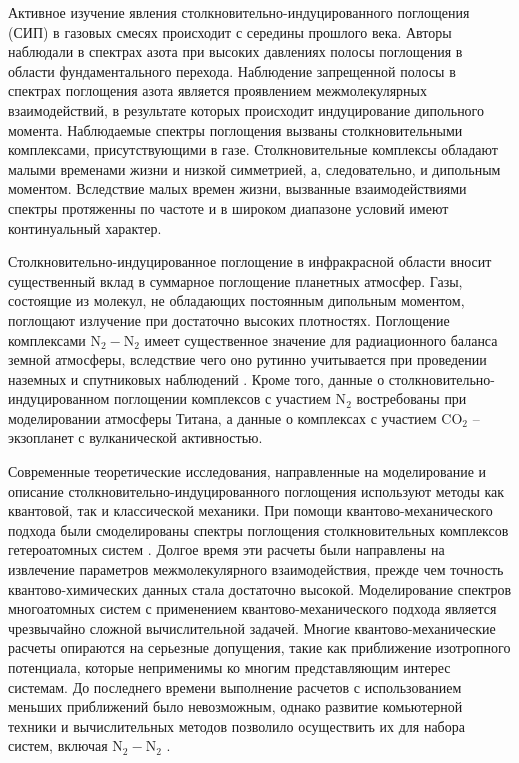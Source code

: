 Активное изучение явления столкновительно-индуцированного поглощения (СИП) в газовых смесях происходит с середины прошлого века. Авторы \cite{crawford1949} наблюдали в спектрах азота при высоких давлениях полосы поглощения в области фундаментального перехода. Наблюдение запрещенной полосы в спектрах поглощения азота является проявлением межмолекулярных взаимодействий, в результате которых происходит индуцирование дипольного момента. Наблюдаемые спектры поглощения вызваны столкновительными комплексами, присутствующими в газе. Столкновительные комплексы обладают малыми временами жизни и низкой симметрией, а, следовательно, и дипольным моментом. Вследствие малых времен жизни, вызванные взаимодействиями спектры протяженны по частоте и в широком диапазоне условий имеют континуальный характер. \par 
Столкновительно-индуцированное поглощение в инфракрасной области вносит существенный вклад в суммарное поглощение планетных атмосфер. Газы, состоящие из молекул, не обладающих постоянным дипольным моментом, поглощают излучение при достаточно высоких плотностях. Поглощение комплексами N$_2-$N$_2$ имеет существенное значение для радиационного баланса земной атмосферы, вследствие чего оно рутинно учитывается при проведении наземных и спутниковых наблюдений \cite{sioris2014}. Кроме того, данные о столкновительно-индуцированном поглощении комплексов с участием N$_2$ востребованы при моделировании атмосферы Титана, а данные о комплексах с участием CO$_2$ -- экзопланет с вулканической активностью. \par
Современные теоретические исследования, направленные на моделирование и описание столкновительно-индуцированного поглощения используют методы как квантовой, так и классической механики. При помощи квантово-механического подхода были смоделированы спектры поглощения столкновительных комплексов гетероатомных систем \cite{sharma1975, meyer1986}. Долгое время эти расчеты были направлены на извлечение параметров межмолекулярного взаимодействия, прежде чем точность квантово-химических данных стала достаточно высокой. Моделирование спектров многоатомных систем с применением квантово-механического подхода является чрезвычайно сложной вычислительной задачей. Многие квантово-механические расчеты опираются на серьезные допущения, такие как приближение изотропного потенциала, которые неприменимы ко многим представляющим интерес системам. До последнего времени выполнение расчетов с использованием меньших приближений было невозможным, однако развитие комьютерной техники и вычислительных методов позволило осуществить их для набора систем, включая N$_2-$N$_2$ \cite{karman2015}. \par
